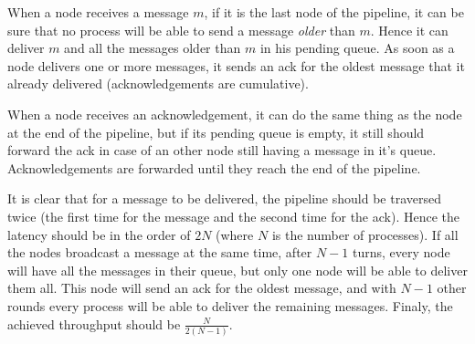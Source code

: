 \documentclass[a4paper]{article}
\begin{document}
When a node receives a message $m$, if it is the last node of the pipeline, it
can be sure that no process will be able to send a message \textit{older} than
$m$. Hence it can deliver $m$ and all the messages older than $m$ in his
pending queue. As soon as a node delivers one or more messages, it sends an
ack for the oldest message that it already delivered (acknowledgements are
cumulative).

When a node receives an acknowledgement, it can do the same thing as the node
at the end of the pipeline, but if its pending queue is empty, it still should
forward the ack in case of an other node still having a message in it's queue.
Acknowledgements are forwarded until they reach the end of the pipeline.

It is clear that for a message to be delivered, the pipeline should be
traversed twice (the first time for the message and the second time for the
ack). Hence the latency should be in the order of $2N$ (where $N$ is the
number of processes). If all the nodes broadcast a message at the same time,
after $N-1$ turns, every node will have all the messages in their queue, but
only one node will be able to deliver them all. This node will send an ack for
the oldest message, and with $N-1$ other rounds every process will be able to
deliver the remaining messages. Finaly, the achieved throughput should be
$\frac{N}{2(N-1)}$.
\end{document}
